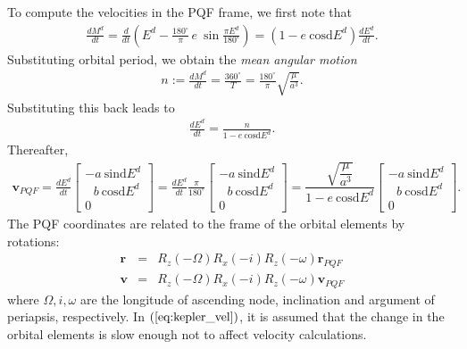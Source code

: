 \documentclass [12pt, a4paper] {article}
\newcommand{\sind}
{
	\textrm{sind}
}
\newcommand{\cosd}
{
	\textrm{cosd}
}
\newcommand{\vc}[1]
{
	\boldsymbol{#1}
}
\newcommand{\diff}[2]
{
	\frac{d #1}{d #2}
}
\begin{document}
To compute the velocities in the PQF frame, we first note that 
\begin {eqnarray}
  \diff{M^d}{t}
  =
  \diff{}{t}\left(
  E^d - \frac{180^\circ}{\pi}\,e\:\sin\frac{\pi E^d}{180^\circ}
  \right)
  = 
  \left(1 - e\:\cosd E^d\right)\diff{E^d}{t}.
\end {eqnarray}
Substituting orbital period, we obtain the \emph{mean angular motion}
\begin {eqnarray}
  n := \diff{M^d}{t} = \frac{360^\circ}{T} = \frac{180^\circ}{\pi}\sqrt{\frac{\mu}{a^3}}.
\end {eqnarray}
Substituting this back leads to 
\begin {eqnarray}
  \diff{E^d}{t} = \frac{n}{1 - e\:\cosd E^d}.
\end {eqnarray}
Thereafter, 
\begin {eqnarray}
  \vc v_{PQF} 
  =
  \diff{E^d}{t}
  \begin {bmatrix}
    -a\:\sind E^d \\
     \:\:\:b\:\cosd E^d \\
     0
  \end {bmatrix}
  =
  \diff{E^d}{t}
  \frac{\pi}{180^\circ}
  \begin {bmatrix}
    -a\:\sind E^d \\
     \:\:\:b\:\cosd E^d \\
     0
  \end {bmatrix}
  =
  \dfrac{\sqrt{\dfrac{\mu}{a^3}}}{1 - e\:\cosd E^d}
  \begin {bmatrix}
    -a\:\sind E^d \\
     \:\:\:b\:\cosd E^d \\
     0
  \end {bmatrix}.
\end {eqnarray}
The PQF coordinates are related to the frame of the orbital elements by 
rotations:
\begin {eqnarray}
  \label{eq:kepler_pos}
  \vc r &=& R_z(-\Omega)R_x(-i)R_z(-\omega) \vc r_{PQF}\\
  \label{eq:kepler_vel}
  \vc v &=& R_z(-\Omega)R_x(-i)R_z(-\omega) \vc v_{PQF}
\end {eqnarray}
where $\Omega, i, \omega$ are the longitude of ascending node, inclination 
and argument of periapsis, respectively. In $(\ref{eq:kepler_vel})$, it is 
assumed that the change in the orbital elements is slow enough not to affect 
velocity calculations.
\end{document}
